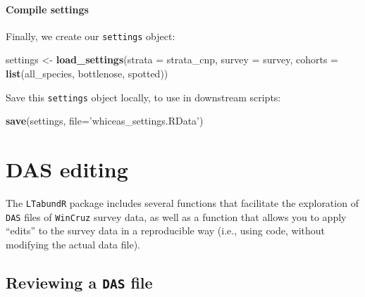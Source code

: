 \documentclass[
]{book}
\newenvironment{Shaded}{\begin{snugshade}}{\end{snugshade}}
\newcommand{\DataTypeTok}[1]{\textcolor[rgb]{0.13,0.29,0.53}{#1}}
\newcommand{\KeywordTok}[1]{\textcolor[rgb]{0.13,0.29,0.53}{\textbf{#1}}}
\newcommand{\NormalTok}[1]{#1}
\newcommand{\StringTok}[1]{\textcolor[rgb]{0.31,0.60,0.02}{#1}}
\begin{document}
\hypertarget{compile-settings}{%
\subsubsection*{Compile settings}\label{compile-settings}}

Finally, we create our \texttt{settings} object:

\begin{Shaded}
\begin{Highlighting}[]
\NormalTok{settings <-}\StringTok{ }\KeywordTok{load_settings}\NormalTok{(}\DataTypeTok{strata =}\NormalTok{ strata_cnp,}
                          \DataTypeTok{survey =}\NormalTok{ survey,}
                          \DataTypeTok{cohorts =} \KeywordTok{list}\NormalTok{(all_species,}
\NormalTok{                                         bottlenose,}
\NormalTok{                                         spotted))}
\end{Highlighting}
\end{Shaded}

Save this \texttt{settings} object locally, to use in downstream scripts:

\begin{Shaded}
\begin{Highlighting}[]
\KeywordTok{save}\NormalTok{(settings, }\DataTypeTok{file=}\StringTok{'whiceas_settings.RData'}\NormalTok{)}
\end{Highlighting}
\end{Shaded}

\hypertarget{das}{%
\chapter{DAS editing}\label{das}}

The \texttt{LTabundR} package includes several functions that facilitate the exploration of \texttt{DAS} files of \texttt{WinCruz} survey data, as well as a function that allows you to apply ``edits'' to the survey data in a reproducible way (i.e., using code, without modifying the actual data file).

\hypertarget{reviewing-a-das-file}{%
\section*{\texorpdfstring{Reviewing a \texttt{DAS} file}{Reviewing a DAS file}}\label{reviewing-a-das-file}}
\end{document}
